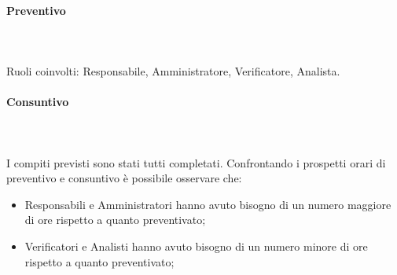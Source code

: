 \paragraph{Preventivo} \hspace{1cm} 
\\ \hspace{1cm} \\
Ruoli coinvolti: Responsabile, Amministratore, Verificatore, Analista.
\begin{table}[H]
\centering
{}
\caption{Preventivo dell'impegno orario di ciascun membro durante il periodo I}
\end{table}

\paragraph{Consuntivo} \hspace{1cm} 
\\ \hspace{1cm} \\
I compiti previsti sono stati tutti completati.
Confrontando i prospetti orari di preventivo e consuntivo è possibile osservare che:
\begin{itemize}
    \item Responsabili e Amministratori hanno avuto bisogno di un numero maggiore di ore rispetto a quanto preventivato;
    \item Verificatori e Analisti hanno avuto bisogno di un numero minore di ore rispetto a quanto preventivato;
\end{itemize}

